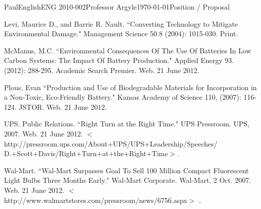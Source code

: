 \documentclass[12pt,letterpaper]{article}
\begin{document}
\begin{mla}{Paul}{English}{ENG 2010-002}{Professor Argyle}{\today}{Position / Proposal}
\begin{workscited}
\bibent
Levi, Maurice D., and Barrie R. Nault. ``Converting Technology to Mitigate Environmental Damage." Management Science 50.8 (2004): 1015-030. Print.

\bibent
McManus, M.C. ``Environmental Consequences Of The Use Of Batteries In Low Carbon Systems: The Impact Of Battery Production." Applied Energy 93. (2012): 288-295. Academic Search Premier. Web. 21 June 2012.

\bibent
Plous, Evan ``Production and Use of Biodegradable Materials for Incorporation in a Non-Toxic, Eco-Friendly Battery." Kansas Academy of Science 110, (2007): 116-124. JSTOR. Web. 21 June 2012.

\bibent
UPS. Public Relations. ``Right Turn at the Right Time." UPS Pressroom. UPS, 2007. Web. 21 June 2012. $<$http://pressroom.ups.com/About+UPS/UPS+Leadership/Speeches/\\D.+Scott+Davis/Right+Turn+at+the+Right+Time$>$.

\pagebreak
\bibent
Wal-Mart. ``Wal-Mart Surpasses Goal To Sell 100 Million Compact Fluorescent Light Bulbs Three Months Early." Wal-Mart Corporate. Wal-Mart, 2 Oct. 2007. Web. 21 June 2012. $<$http://www.walmartstores.com/pressroom/news/6756.aspx$>$ .


\end{workscited}
\end{mla}
\end{document}
